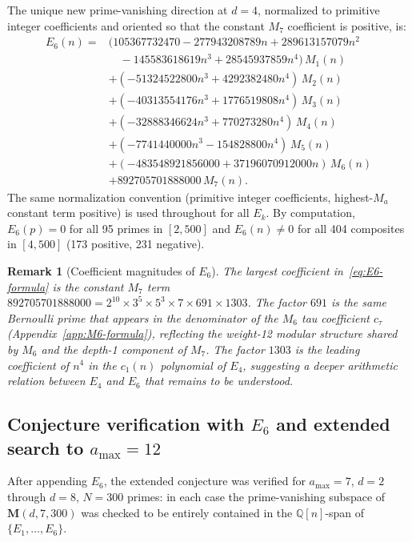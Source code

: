 \documentclass[11pt]{article}
\newtheorem{remark}[theorem]{Remark}
\newcommand{\Q}{\mathbb{Q}}
\begin{document}
The unique new prime-vanishing direction at $d=4$, normalized to primitive integer
coefficients and oriented so that the constant $M_7$ coefficient is positive, is:
\begin{equation}
\label{eq:E6-formula}
\begin{aligned}
E_6(n)={}&(105367732470-277943208789n+289613157079n^2\\
&\quad{}-145583618619n^3+28545937859n^4)\,M_1(n)\\
&+(-51324522800n^3+4292382480n^4)\,M_2(n)\\
&+(-40313554176n^3+1776519808n^4)\,M_3(n)\\
&+(-32888346624n^3+770273280n^4)\,M_4(n)\\
&+(-7741440000n^3-154828800n^4)\,M_5(n)\\
&+(-483548921856000+37196070912000n)\,M_6(n)\\
&+892705701888000\,M_7(n).
\end{aligned}
\end{equation}
The same normalization convention (primitive integer coefficients, highest-$M_a$ constant
term positive) is used throughout for all $E_k$.
By computation, $E_6(p)=0$ for all 95 primes in $[2,500]$ and $E_6(n)\neq 0$ for all 404
composites in $[4,500]$ (173 positive, 231 negative).

\begin{remark}[Coefficient magnitudes of $E_6$]
\label{rem:E6-coeffs}
The largest coefficient in~\eqref{eq:E6-formula} is the constant $M_7$ term
$892705701888000 = 2^{10}\times 3^5\times 5^3\times 7\times 691\times 1303$.
The factor $691$ is the same Bernoulli prime that appears in the denominator of the
$M_6$ tau coefficient $c_\tau$ (Appendix~\ref{app:M6-formula}), reflecting the
weight-12 modular structure shared by $M_6$ and the depth-1 component of $M_7$.
The factor $1303$ is the leading coefficient of $n^4$ in the $c_1(n)$ polynomial
of $E_4$, suggesting a deeper arithmetic relation between $E_4$ and $E_6$ that
remains to be understood.
\end{remark}

\subsection{Conjecture verification with $E_6$ and extended search to $a_{\max}=12$}

After appending $E_6$, the extended conjecture was verified for $a_{\max}=7$, $d=2$ through
$d=8$, $N=300$ primes: in each case the prime-vanishing subspace of $\mathbf{M}(d,7,300)$
was checked to be entirely contained in the $\Q[n]$-span of $\{E_1,\dots,E_6\}$.
\end{document}

